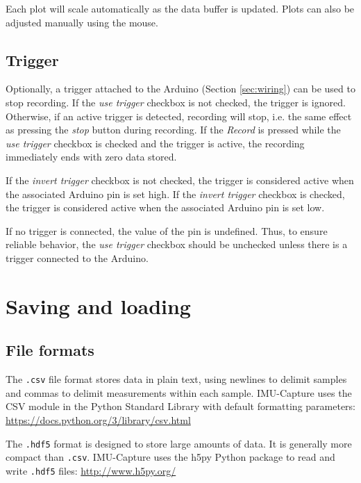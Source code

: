 \documentclass[11pt,letterpaper,article,oneside]{memoir}
\newcommand{\name}{IMU-Capture}
\newcommand{\csv}{\texttt{.csv}}
\newcommand{\hdf}{\texttt{.hdf5}}
\begin{document}
Each plot will scale automatically as the data buffer is updated. Plots can also
be adjusted manually using the mouse.



\section{Trigger}
\label{sec:trigger}

Optionally, a trigger attached to the Arduino (Section \ref{sec:wiring}) can be
used to stop recording.  If the \emph{use trigger} checkbox is not checked, the
trigger is ignored. Otherwise, if an active trigger is detected, recording will
stop, i.e. the same effect as pressing the \emph{stop} button during recording.
If the \emph{Record} is pressed while the \emph{use trigger} checkbox is checked
and the trigger is active, the recording immediately ends with zero data stored.

If the \emph{invert trigger} checkbox is not checked, the trigger is considered
active when the associated Arduino pin is set high. If the \emph{invert trigger}
checkbox is checked, the trigger is considered active when the associated
Arduino pin is set low.

If no trigger is connected, the value of the pin is undefined.  Thus, to ensure
reliable behavior, the \emph{use trigger} checkbox should be unchecked unless
there is a trigger connected to the Arduino.



\chapter{Saving and loading}
\label{sec:savingloading}

\section{File formats}

\label{sec:fileformats}
The \csv{} file format stores data in plain text, using newlines to delimit
samples and commas to delimit measurements within each sample.  \name{} uses the
CSV module in the Python Standard Library with default formatting parameters:
\url{https://docs.python.org/3/library/csv.html}

The \hdf{} format is designed to store large amounts of data. It is generally
more compact than \csv{}. \name{} uses the h5py Python package to read and write
\hdf{} files: \url{http://www.h5py.org/}
\end{document}
